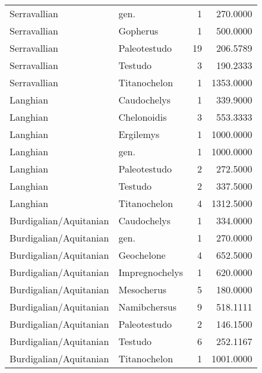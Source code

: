 \begin{longtable}[]{@{}llrr@{}}
	Serravallian & gen. & 1 & 270.0000\tabularnewline
	Serravallian & Gopherus & 1 & 500.0000\tabularnewline
	Serravallian & Paleotestudo & 19 & 206.5789\tabularnewline
	Serravallian & Testudo & 3 & 190.2333\tabularnewline
	Serravallian & Titanochelon & 1 & 1353.0000\tabularnewline
	Langhian & Caudochelys & 1 & 339.9000\tabularnewline
	Langhian & Chelonoidis & 3 & 553.3333\tabularnewline
	Langhian & Ergilemys & 1 & 1000.0000\tabularnewline
	Langhian & gen. & 1 & 1000.0000\tabularnewline
	Langhian & Paleotestudo & 2 & 272.5000\tabularnewline
	Langhian & Testudo & 2 & 337.5000\tabularnewline
	Langhian & Titanochelon & 4 & 1312.5000\tabularnewline
	Burdigalian/Aquitanian & Caudochelys & 1 & 334.0000\tabularnewline
	Burdigalian/Aquitanian & gen. & 1 & 270.0000\tabularnewline
	Burdigalian/Aquitanian & Geochelone & 4 & 652.5000\tabularnewline
	Burdigalian/Aquitanian & Impregnochelys & 1 & 620.0000\tabularnewline
	Burdigalian/Aquitanian & Mesocherus & 5 & 180.0000\tabularnewline
	Burdigalian/Aquitanian & Namibchersus & 9 & 518.1111\tabularnewline
	Burdigalian/Aquitanian & Paleotestudo & 2 & 146.1500\tabularnewline
	Burdigalian/Aquitanian & Testudo & 6 & 252.1167\tabularnewline
	Burdigalian/Aquitanian & Titanochelon & 1 & 1001.0000\tabularnewline
	\bottomrule
\end{longtable}
